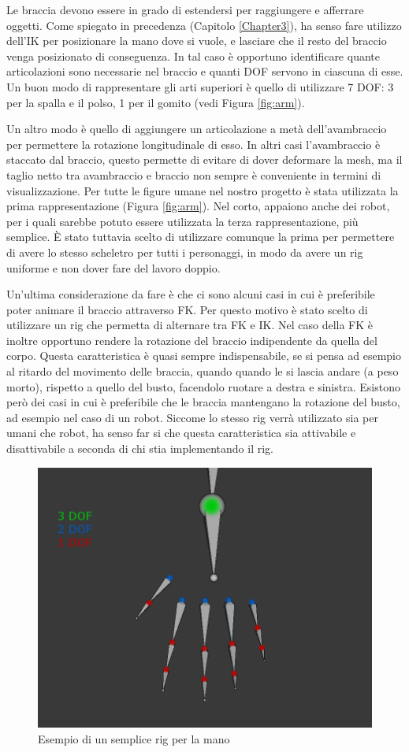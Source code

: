 Le braccia devono essere in grado di estendersi per raggiungere e afferrare oggetti.
Come spiegato in precedenza (Capitolo \ref{Chapter3}), ha senso fare utilizzo dell'IK per posizionare la mano dove si vuole, e lasciare che il resto del braccio venga posizionato di conseguenza.
In tal caso è opportuno identificare quante articolazioni sono necessarie nel braccio e quanti DOF servono in ciascuna di esse.
Un buon modo di rappresentare gli arti superiori è quello di utilizzare 7 DOF: 3 per la spalla e il polso, 1 per il gomito (vedi Figura \ref{fig:arm}).

Un altro modo è quello di aggiungere un articolazione a metà dell'avambraccio per permettere la rotazione longitudinale di esso.
In altri casi l'avambraccio è staccato dal braccio, questo permette di evitare di dover deformare la mesh, ma il taglio netto tra avambraccio e braccio non sempre è conveniente in termini di visualizzazione.
Per tutte le figure umane nel nostro progetto è stata utilizzata la prima rappresentazione (Figura \ref{fig:arm}).
Nel corto, appaiono anche dei robot, per i quali sarebbe potuto essere utilizzata la terza rappresentazione, più semplice.
È stato tuttavia scelto di utilizzare comunque la prima per permettere di avere lo stesso scheletro per tutti i personaggi, in modo da avere un rig uniforme e non dover fare del lavoro doppio.

Un'ultima considerazione da fare è che ci sono alcuni casi in cui è preferibile poter animare il braccio attraverso FK.
Per questo motivo è stato scelto di utilizzare un rig che permetta di alternare tra FK e IK.
Nel caso della FK è inoltre opportuno rendere la rotazione del braccio indipendente da quella del corpo.
Questa caratteristica è quasi sempre indispensabile, se si pensa ad esempio al ritardo del movimento delle braccia, quando quando le si lascia andare (a peso morto), rispetto a quello del busto, facendolo ruotare a destra e sinistra.
Esistono  però dei casi in cui è preferibile che le braccia mantengano la rotazione del busto, ad esempio nel caso di un robot.
Siccome lo stesso rig verrà utilizzato sia per umani che robot, ha senso far si che questa caratteristica sia attivabile e disattivabile a seconda di chi stia implementando il rig.

\begin{figure}
\centering
\includegraphics[width=.8\textwidth]{Figures/hand}
\decoRule
\caption[Rig mano]{Esempio di un semplice rig per la mano}
\label{fig:hand}
\end{figure}

